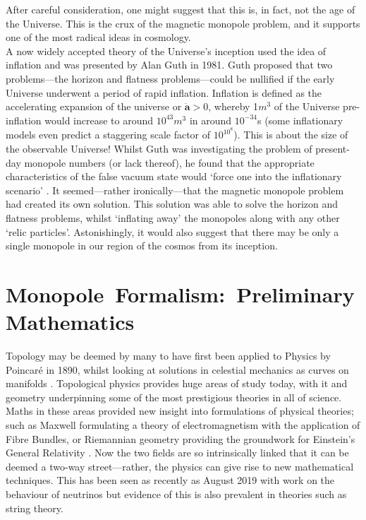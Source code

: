 \documentclass[fleqn, twocolumn, 10pt]{article}
\begin{document}
After careful consideration, one might suggest that this is, in fact, not the age of the Universe. This is the crux of the magnetic monopole problem, and it supports one of the most radical ideas in cosmology. \\
\indent A now widely accepted theory of the Universe's inception used the idea of inflation and was presented by Alan Guth in 1981. Guth proposed that two problems---the horizon and flatness problems---could be nullified if the early Universe underwent a period of rapid inflation. Inflation is defined as the accelerating expansion of the universe or $\bm{\ddot{a}} > 0$, whereby 1$m^3$ of the Universe pre-inflation would increase to around $10^{43}m^3$ in around $10^{-34}$s \cite{liddle2015cosmo}(some inflationary models even predict a staggering scale factor of $10^{10^8}$). This is about the size of the observable Universe! Whilst Guth was investigating the problem of present-day monopole numbers (or lack thereof), he found that the appropriate characteristics of the false vacuum state would `force one into the inflationary scenario' \cite{guth1981inflate}. It seemed---rather ironically---that the magnetic monopole problem had created its own solution. This solution was able to solve the horizon and flatness problems, whilst `inflating away' the monopoles \cite{liddle2015cosmo, rajantie2012magnetic} along with any other `relic particles'. Astonishingly, it would also suggest that there may be only a single monopole in our region of the cosmos from its inception. 


\section{\mbox{Monopole Formalism: Preliminary} Mathematics}

Topology may be deemed by many to have first been applied to Physics by Poincar\'e in 1890, whilst looking at solutions in celestial mechanics as curves on manifolds \cite{simon2018tying}. Topological physics provides huge areas of study today, with it and geometry underpinning some of the most prestigious theories in all of science. Maths in these areas provided new insight into formulations of physical theories; such as Maxwell formulating a theory of electromagnetism with the application of Fibre Bundles, or Riemannian geometry providing the groundwork for Einstein’s General Relativity \cite{papic2020powerpoint}. Now the two fields are so intrinsically linked that it can be deemed a two-way street---rather, the physics can give rise to new mathematical techniques. This has been seen as recently as August 2019 with work on the behaviour of neutrinos \cite{neutrino2019eigenvalues} but evidence of this is also prevalent in theories such as string theory.
\end{document}
